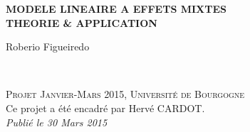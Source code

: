 \documentclass[11pt,fleqn]{book} %
\begin{document}
\let\cleardoublepage\clearpage


\begingroup
\thispagestyle{empty}
\centering
\vspace*{5cm}
\par\normalfont\fontsize{35}{35}\sffamily\selectfont
\textbf{MODELE LINEAIRE A EFFETS MIXTES\\ THEORIE \& APPLICATION }\\
{\LARGE }\par %
\vspace*{1cm}
{\Huge Roberio Figueiredo}\par %
\endgroup


\newpage
~\vfill
\thispagestyle{empty}


\noindent \textsc{Projet Janvier-Mars 2015, Université de Bourgogne}\\

\noindent Ce projet a été encadré par Hervé CARDOT.\\ %

\noindent \textit{Publié le 30 Mars 2015} %



\pagestyle{empty} %

\renewcommand\contentsname{Table des Matières}
\renewcommand{\bibname}{Bibliographie}
\tableofcontents%


\pagestyle{fancy} %
\end{document}
